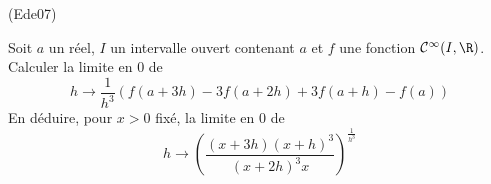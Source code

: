 \begin{tiny}(Ede07)\end{tiny} Soit $a$ un réel, $I$ un intervalle ouvert contenant $a$ et $f$ une fonction $\mathcal C^\infty(I,\R)$. Calculer la limite en $0$ de
\begin{displaymath}
 h\rightarrow \frac{1}{h^3}\left(f(a+3h)-3f(a+2h)+3f(a+h)-f(a) \right) 
\end{displaymath}
En déduire, pour $x>0$ fixé, la limite en $0$ de
\begin{displaymath}
 h\rightarrow \left( \frac{(x+3h)(x+h)^3}{(x+2h)^3x}\right)^{\frac{1}{h^3}} 
\end{displaymath}
 